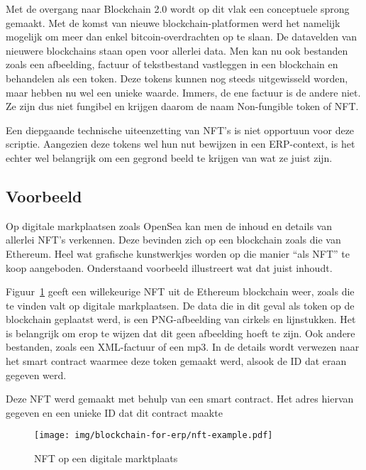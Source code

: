 Met de overgang naar Blockchain 2.0 wordt op dit vlak een conceptuele sprong gemaakt. Met de komst van nieuwe blockchain-platformen werd het namelijk mogelijk om meer dan enkel bitcoin-overdrachten op te slaan. De datavelden van nieuwere blockchains staan open voor allerlei data. Men kan nu ook bestanden zoals een afbeelding, factuur of tekstbestand vastleggen in een blockchain en behandelen als een token. Deze tokens kunnen nog steeds uitgewisseld worden, maar hebben nu wel een unieke waarde. Immers, de ene factuur is de andere niet. Ze zijn dus niet fungibel en krijgen daarom de naam Non-fungible token of NFT.

Een diepgaande technische uiteenzetting van NFT's is niet opportuun voor deze scriptie. Aangezien deze tokens wel hun nut bewijzen in een ERP-context, is het echter wel belangrijk om een gegrond beeld te krijgen van wat ze juist zijn.

\subsection{Voorbeeld}

Op digitale markplaatsen zoals OpenSea kan men de inhoud en details van allerlei NFT's verkennen. Deze bevinden zich op een blockchain zoals die van Ethereum. Heel wat grafische kunstwerkjes worden op die manier ``als NFT'' te koop aangeboden. Onderstaand voorbeeld illustreert wat dat juist inhoudt.

Figuur~\ref{fig:nft-example} geeft een willekeurige NFT uit de Ethereum blockchain weer, zoals die te vinden valt op digitale markplaatsen. De data die in dit geval als token op de blockchain geplaatst werd, is een PNG-afbeelding van cirkels en lijnstukken. Het is belangrijk om erop te wijzen dat dit geen afbeelding hoeft te zijn. Ook andere bestanden, zoals een XML-factuur of een mp3. In de details wordt verwezen naar het smart contract waarmee deze token gemaakt werd, alsook de ID dat eraan gegeven werd.

Deze NFT werd gemaakt met behulp van een smart contract. Het adres hiervan gegeven en een unieke ID dat dit contract maakte

\begin{figure}[H]
	\centering
	\texttt{[image: img/blockchain-for-erp/nft-example.pdf]}
	\caption{\label{fig:nft-example}NFT op een digitale marktplaats}
\end{figure}

